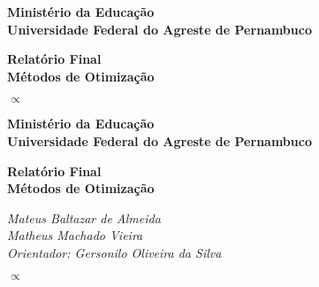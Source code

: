 

\thispagestyle{empty}


\begin{center}
{\huge \textbf{Ministério da Educação}} \\
{\huge \textbf{Universidade Federal do Agreste de Pernambuco}}
\end{center}

\vspace {8cm}

\begin{center}
{\huge \textbf{Relatório Final}} \\
{\huge \textbf{Métodos de Otimização}}
\end{center}




\newpage

\thispagestyle{empty}

\begin{center}
$\propto$
\end{center}




\newpage

\thispagestyle{empty}



\begin{center}
{\huge \textbf{Ministério da Educação}} \\
{\huge \textbf{Universidade Federal do Agreste de Pernambuco}}
\end{center}

\vspace{6cm}

\begin{center}
{\huge \textbf{Relatório Final}} \\
{\huge \textbf{Métodos de Otimização}}
\end{center}

\vspace{5cm}

\begin{center}
{\Large\textit{Mateus Baltazar de Almeida}} \\
{\Large\textit{Matheus Machado Vieira}} \\
{\Large\textit{Orientador: Gersonilo Oliveira da Silva}}
\end{center}

\newpage
\thispagestyle{empty}

\begin{center}
$\propto$
\end{center}
